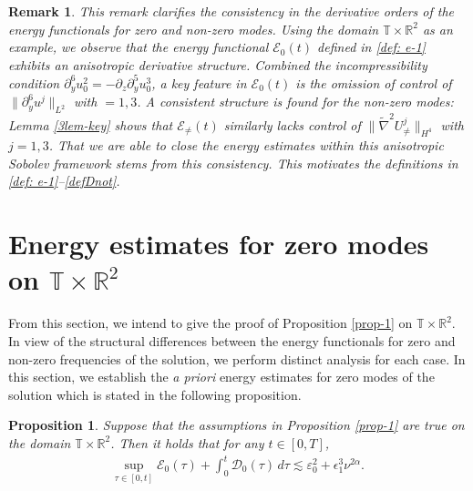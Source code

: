 \documentclass[11pt,reqno]{article}
\newtheorem{prop}[theo]{Proposition}
\newtheorem{rema}[theo]{Remark}
\numberwithin{equation}{section}
\newcommand\R{{\mathbb R}}
\newcommand\T{{\mathbb T}}
\newcommand\D{{\mathcal D}}
\newcommand\E{{\mathcal E}}
\let\pa=\partial
\let\al=\alpha
\let\var=\varepsilon
\let\ep=\epsilon
\begin{document}
\begin{rema}
This remark clarifies the consistency in the derivative orders of the energy functionals for zero and non-zero modes. 
Using the domain $\T\times\R^2$ as an example, we observe that the energy functional $\mathcal{E}_0(t)$ defined in \eqref{def: e-1} exhibits an anisotropic derivative structure.
Combined the incompressibility condition $\partial_y^6 u_0^2 = -\partial_z\partial_y^5 u_0^3$, a key feature in $\mathcal{E}_0(t)$ is the omission of control of $\|\pa_y^6u^j\|_{L^2}$ with $=1,3$.
A consistent structure is found for the non-zero modes:
Lemma \ref{3lem-key} shows that $\E_{\not=}(t)$ similarly lacks control of
$\|\widetilde{\nabla}^2U^j_{\not=}\|_{H^4}$ with $j=1,3$.
That we are able to close the energy estimates within this anisotropic Sobolev framework stems from this consistency. This motivates the definitions in \eqref{def: e-1}--\eqref{defDnot}.
\end{rema}



\section{Energy estimates for zero modes on \texorpdfstring{$\T\times\R^2$}{T x R2}}\label{sec4:energy est zero}

From this section, we intend to give the proof of Proposition \ref{prop-1} on $\T\times\R^2$.
In view of the structural differences between the energy functionals for zero and non-zero frequencies of the solution, we perform distinct analysis for each case.
In this section, we establish the \textit{a priori} energy estimates for zero modes of the solution which is stated in the following proposition. 
\begin{prop}\label{lemm-1}
Suppose that the assumptions in Proposition \ref{prop-1} are true on the domain $\T\times\R^2$.
Then it holds that for any $t\in[0,T]$,
\begin{align}
	\label{priori result-0}
	\sup_{\tau\in[0,t]}\E_0(\tau)
	+\int_0^t \D_0(\tau)\,d\tau
	\lesssim \var_0^2+ \ep_1^3\nu^{2\al}.
\end{align}
\end{prop}



\end{document}
